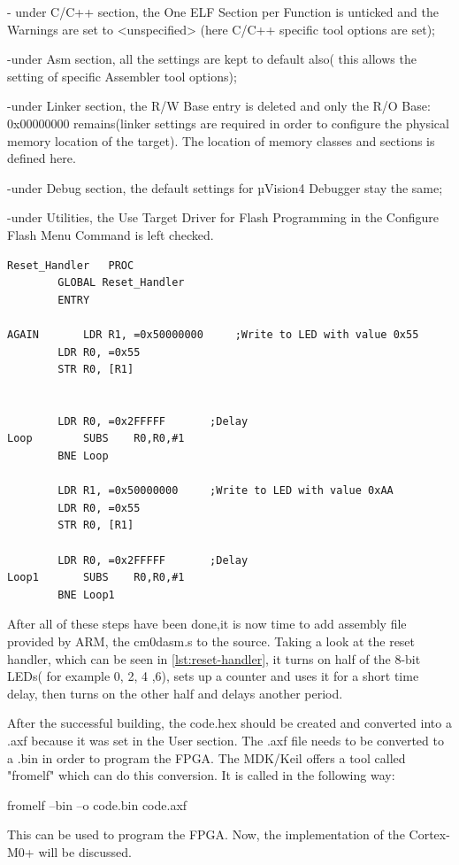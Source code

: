 - under C/C++ section, the One ELF Section per Function is unticked and the Warnings are set to <unspecified> (here C/C++ specific tool options are set);

-under Asm section, all the settings are kept to default also( this allows the setting of specific Assembler tool options);

-under Linker section, the R/W Base entry is deleted and only the R/O Base: 0x00000000 remains(linker settings are required in order to configure the physical memory location of the target). The location of memory classes and sections is defined here.

-under Debug section, the default settings for µVision4 Debugger stay the same;

-under Utilities, the Use Target Driver for Flash Programming in the Configure Flash Menu Command is left checked.

\begin{lstlisting}[caption={Reset Handler},label={lst:reset-handler}]
Reset_Handler	PROC
		GLOBAL Reset_Handler
		ENTRY

AGAIN		LDR	R1, =0x50000000		;Write to LED with value 0x55
		LDR	R0, =0x55
		STR	R0, [R1]


		LDR	R0, =0x2FFFFF		;Delay
Loop		SUBS	R0,R0,#1
		BNE Loop

		LDR	R1, =0x50000000		;Write to LED with value 0xAA
		LDR	R0, =0x55
		STR	R0, [R1]

		LDR	R0, =0x2FFFFF		;Delay
Loop1		SUBS	R0,R0,#1
		BNE Loop1
\end{lstlisting}

After all of these steps have been done,it is now time to add assembly file provided by ARM, the cm0dasm.s to the source. Taking a look at the reset handler, which can be seen in \ref{lst:reset-handler}, it turns on half of the 8-bit LEDs( for example 0, 2, 4 ,6), sets up a counter and uses it for a short time delay, then turns on the other half and delays another period.

After the successful building, the code.hex should be created and converted into a .axf because it was set in the User section. The .axf file needs to be converted to a .bin in order to program the FPGA. The MDK/Keil offers a tool called "fromelf" which can do this conversion. It is called in the following way:

fromelf --bin --o code.bin code.axf

This can be used to program the FPGA. Now, the implementation of the Cortex-M0+ will be discussed.

